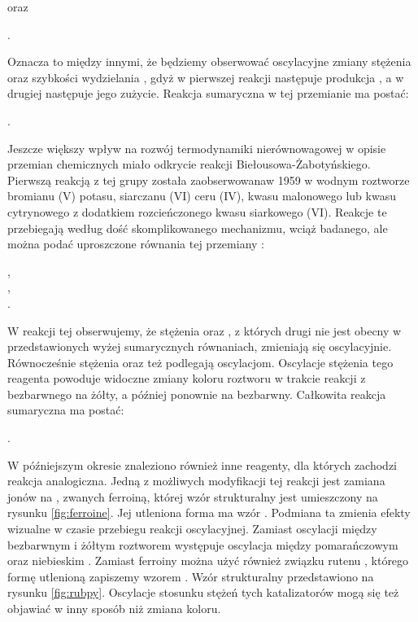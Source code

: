 \documentclass[10pt, a4paper, twoside, onecolumn]{article}
\numberwithin{equation}{section}
\begin{document}
	\begin{center}
	\end{center}
	oraz
	\begin{center}
		.
	\end{center}
	Oznacza to między innymi, że będziemy obserwować oscylacyjne zmiany stężenia  oraz szybkości wydzielania , gdyż w pierwszej reakcji następuje produkcja , a w drugiej następuje jego zużycie. Reakcja sumaryczna w tej przemianie ma postać: 
	\begin{center}
		.
	\end{center}
	
	Jeszcze większy wpływ na rozwój termodynamiki nierównowagowej w opisie przemian chemicznych miało odkrycie reakcji Biełousowa-Żabotyńskiego. Pierwszą reakcją z tej grupy została zaobserwowanaw 1959 w wodnym roztworze bromianu (V) potasu, siarczanu (VI) ceru (IV), kwasu malonowego lub kwasu cytrynowego z dodatkiem rozcieńczonego kwasu siarkowego (VI). Reakcje te przebiegają według dość skomplikowanego mechanizmu, wciąż badanego, ale można podać uproszczone równania tej przemiany \cite{orlik}: %
	\begin{center}
		, \\
		, \\
		.
	\end{center}
	W reakcji tej obserwujemy, że stężenia  oraz , z których drugi nie jest obecny w przedstawionych wyżej sumarycznych równaniach, zmieniają się oscylacyjnie. Równocześnie stężenia  oraz  też podlegają oscylacjom. Oscylacje stężenia tego reagenta powoduje widoczne zmiany koloru roztworu w trakcie reakcji z bezbarwnego na żółty, a później ponownie na bezbarwny. Całkowita reakcja sumaryczna ma postać: 
	\begin{center}
		.
	\end{center}
	W późniejszym okresie znaleziono również inne reagenty, dla których zachodzi reakcja analogiczna. Jedną z możliwych modyfikacji tej reakcji jest zamiana jonów  na , zwanych ferroiną, której wzór strukturalny jest umieszczony na rysunku \ref{fig:ferroine}. Jej utleniona forma ma wzór . Podmiana ta zmienia efekty wizualne w czasie przebiegu reakcji oscylacyjnej. Zamiast oscylacji między bezbarwnym i żółtym roztworem występuje oscylacja między pomarańczowym oraz niebieskim \cite{orlik}. Zamiast ferroiny można użyć również związku rutenu , którego formę utlenioną zapiszemy wzorem . Wzór strukturalny  przedstawiono na rysunku \ref{fig:rubpy}. Oscylacje stosunku stężeń tych katalizatorów mogą się też objawiać w inny sposób niż zmiana koloru. \cite{osypova}\par
\end{document}
